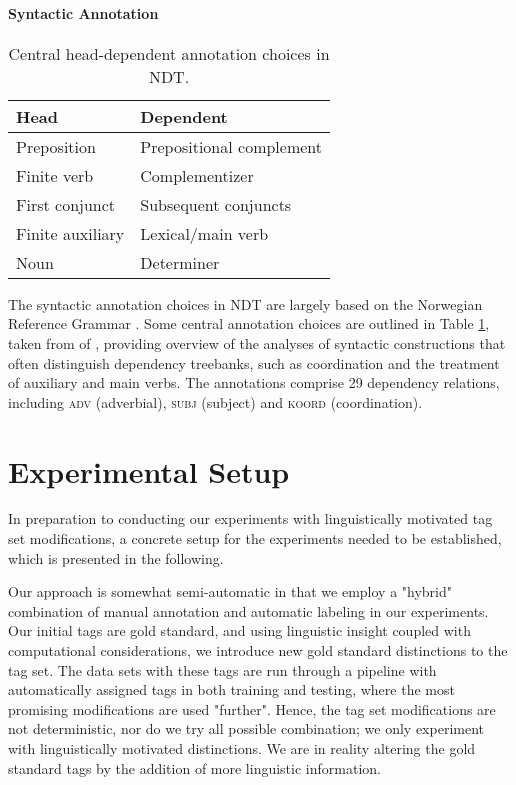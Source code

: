\documentclass[11pt,a4paper]{article}
\begin{document}
\paragraph{Syntactic Annotation}
\begin{table}
    \centering
    \smaller[0.5]
    \begin{tabular}{@{}ll@{}}
        \toprule
        \textbf{Head} & \textbf{Dependent} \\
        \midrule
        Preposition & Prepositional complement \\
        Finite verb & Complementizer \\
        First conjunct & Subsequent conjuncts \\
        Finite auxiliary & Lexical/main verb \\
        Noun & Determiner \\
        \bottomrule
    \end{tabular}
    \caption{Central head-dependent annotation choices in NDT.}
    \label{ndtannotation}
\end{table}

The syntactic annotation choices in NDT are largely based on the Norwegian
Reference Grammar \cite{Faa:Lie:Van:97}. Some central annotation choices are outlined in
Table \ref{ndtannotation}, taken from of ,
providing overview of the analyses of syntactic constructions that often
distinguish dependency treebanks, such as coordination and the treatment of
auxiliary and main verbs. The annotations comprise 29
dependency relations, including \textsc{adv} (adverbial), \textsc{subj}
(subject) and \textsc{koord} (coordination).

\section{Experimental Setup}
\label{sec:setup}
In preparation to conducting our experiments with linguistically motivated tag
set modifications, a concrete setup for the experiments needed to be
established, which is presented in the following.

Our approach is somewhat semi-automatic in that we employ a "hybrid"
combination of manual annotation and automatic labeling in our experiments. Our
initial tags are gold standard, and using linguistic insight coupled with
computational considerations, we introduce new gold standard distinctions to
the tag set. The data sets with these tags are run through a pipeline with
automatically assigned tags in both training and testing, where the most
promising modifications are used "further". Hence, the tag set modifications
are not deterministic, nor do we try all possible combination; we only
experiment with linguistically motivated distinctions. We are in reality
altering the gold standard tags by the addition of more linguistic information.
\end{document}
